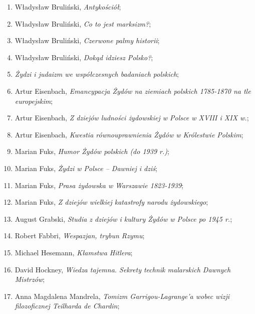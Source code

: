 \documentclass[a4paper,11pt]{article}
\begin{document}
\begin{enumerate}
\item Władysław Bruliński, \textit{Antykościół};

\item Władysław Bruliński, \textit{Co to jest marksizm?};

\item Władysław Bruliński, \textit{Czerwone palmy historii};

\item Władysław Bruliński, \textit{Dokąd idziesz Polsko?};

\item \textit{Żydzi i judaizm we współczesnych badaniach polskich};

\item Artur Eisenbach, \textit{Emancypacja Żydów na ziemiach polskich
    1785-1870 na tle europejskim};

\item Artur Eisenbach, \textit{Z dziejów ludności żydowskiej w Polsce w
    XVIII i XIX w.};

\item Artur Eisenbach, \textit{Kwestia równouprawnienia Żydów w
    Królestwie Polskim};

\item Marian Fuks, \textit{Humor Żydów polskich (do 1939 r.)};

\item Marian Fuks, \textit{Żydzi w Polsce – Dawniej i dziś};

\item Marian Fuks, \textit{Prasa żydowska w Warszawie 1823-1939};

\item Marian Fuks, \textit{Z dziejów wielkiej katastrofy narodu
    żydowskiego};

\item August Grabski, \textit{Studia z dziejów i kultury Żydów w Polsce
    po 1945 r.};

\item Robert Fabbri, \textit{Wespazjan, trybun Rzymu};

\item Michael Hesemann, \textit{Kłamstwa Hitlera};

\item David Hockney, \textit{Wiedza tajemna. Sekrety technik malarskich
    Dawnych Mistrzów};

\item Anna Magdalena Mandrela, \textit{Tomizm Garrigou-Lagrange’a wobec
    wizji filozoficznej Teilharda de Chardin};


\end{enumerate}
\end{document}
